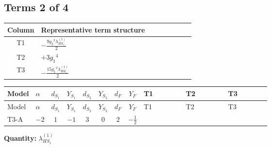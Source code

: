 \documentclass[8pt]{article}
\begin{document}
\begin{landscape}
\subsection*{Terms 2 of 4}
\begin{center}
\begin{tabular}{@{}c >{\raggedright\arraybackslash}p{0.82\linewidth}@{}}
\toprule
Column & Representative term structure \\
\midrule
T1 & \(\displaystyle -\frac{9 {g_2}^2 {\lambda_{HS_1}^{(1)}}}{2}\) \\
\midrule
T2 & \(\displaystyle +3 {g_1}^4\) \\
\midrule
T3 & \(\displaystyle -\frac{15 {g_1}^2 {\lambda_{HS_1}^{(1)}}}{2}\) \\
\midrule
\bottomrule
\end{tabular}
\end{center}
\smallskip
\tiny
\begin{longtable}{@{}llcccccc >{\raggedright\arraybackslash}p{0.21\linewidth} >{\raggedright\arraybackslash}p{0.21\linewidth} >{\raggedright\arraybackslash}p{0.21\linewidth}@{}}
\toprule
Model & $\alpha$ & $d_{S_1}$ & $Y_{S_1}$ & $d_{S_2}$ & $Y_{S_2}$ & $d_F$ & $Y_F$ & T1 & T2 & T3 \\
\midrule
\endfirsthead
\toprule
Model & $\alpha$ & $d_{S_1}$ & $Y_{S_1}$ & $d_{S_2}$ & $Y_{S_2}$ & $d_F$ & $Y_F$ & T1 & T2 & T3 \\
\midrule
\endhead
T3-A & $-2$ & $1$ & $-1$ & $3$ & $0$ & $2$ & $-\frac{1}{2}$ & \scriptsize\adjustbox{max width=\linewidth}{$\begin{gathered} -\frac{9 {g_2}^2 {\lambda_{HS_1}^{(1)}}}{2}\end{gathered}$} & \scriptsize\adjustbox{max width=\linewidth}{$\begin{gathered} +3 {g_1}^4\end{gathered}$} & \scriptsize\adjustbox{max width=\linewidth}{$\begin{gathered} -\frac{15 {g_1}^2 {\lambda_{HS_1}^{(1)}}}{2}\end{gathered}$} \\
\midrule
\bottomrule
\end{longtable}
\clearpage
\noindent\textbf{Quantity: }$\lambda_{HS_1}^{(1)}$\par\smallskip

\end{landscape}
\end{document}
